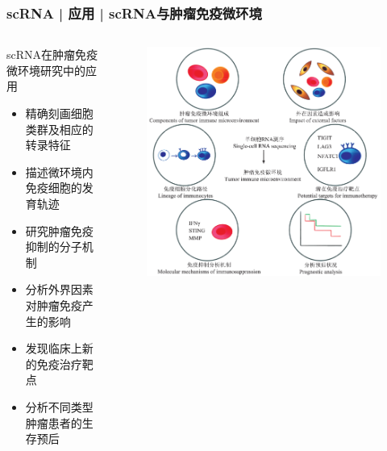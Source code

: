 \documentclass[11pt]{ctexbeamer}
\begin{document}
\begin{frame}
  \frametitle{scRNA | 应用 | scRNA与肿瘤免疫微环境}
    \begin{columns}
    \begin{block}{scRNA在肿瘤免疫微环境研究中的应用}
    \begin{itemize}
      \item 精确刻画细胞类群及相应的转录特征
      \item 描述微环境内免疫细胞的发育轨迹
      \item 研究肿瘤免疫抑制的分子机制
      \item 分析外界因素对肿瘤免疫产生的影响
      \item 发现临床上新的免疫治疗靶点
      \item 分析不同类型肿瘤患者的生存预后
    \end{itemize}
   \end{block}
    \begin{figure}
    \centering
    \includegraphics[width=\textwidth]{tumor_scRNA_01.png}
  \end{figure}
  \end{columns}
\end{frame}
\end{document}
